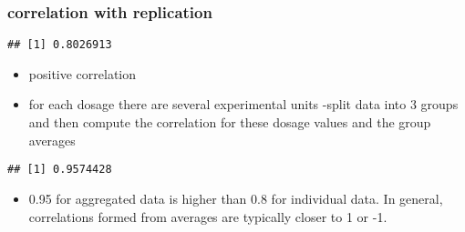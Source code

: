 \documentclass[
]{book}
\newenvironment{Shaded}{\begin{snugshade}}{\end{snugshade}}
\newcommand{\DecValTok}[1]{\textcolor[rgb]{0.00,0.00,0.81}{#1}}
\newcommand{\FloatTok}[1]{\textcolor[rgb]{0.00,0.00,0.81}{#1}}
\newcommand{\FunctionTok}[1]{\textcolor[rgb]{0.00,0.00,0.00}{#1}}
\newcommand{\NormalTok}[1]{#1}
\newcommand{\OtherTok}[1]{\textcolor[rgb]{0.56,0.35,0.01}{#1}}
\newcommand{\SpecialCharTok}[1]{\textcolor[rgb]{0.00,0.00,0.00}{#1}}
\providecommand{\tightlist}{%
  \setlength{\itemsep}{0pt}\setlength{\parskip}{0pt}}
\theoremstyle{definition}
\theoremstyle{definition}
\theoremstyle{definition}
\theoremstyle{definition}
\theoremstyle{remark}
\begin{document}
\hypertarget{correlation-with-replication}{%
\subsubsection{correlation with replication}\label{correlation-with-replication}}

\begin{Shaded}
\end{Shaded}

\begin{verbatim}
## [1] 0.8026913
\end{verbatim}

\begin{itemize}
\tightlist
\item
  positive correlation
\item
  for each dosage there are several experimental units
  -split data into 3 groups and then compute the correlation for these dosage values and the group averages
\end{itemize}

\begin{Shaded}
\end{Shaded}

\begin{verbatim}
## [1] 0.9574428
\end{verbatim}

\begin{itemize}
\tightlist
\item
  0.95 for aggregated data is higher than 0.8 for individual data. In general, correlations formed from averages are typically closer to 1 or -1.
\end{itemize}
\end{document}
